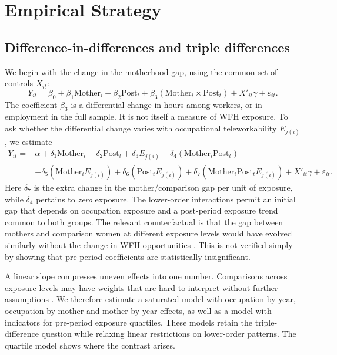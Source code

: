 \documentclass[12pt,a4paper]{article}
\newcommand{\Mother}{\text{Mother}}
\newcommand{\Post}{\text{Post}}
\begin{document}
\section{Empirical Strategy}\label{sec:strategy}
\subsection{Difference-in-differences and triple differences}
We begin with the change in the motherhood gap, using the common set of controls $X_{it}$:
\begin{equation}\label{eq:did}
Y_{it}=\beta_0+\beta_1\Mother_i+\beta_2\Post_t+\beta_3(\Mother_i\times\Post_t)+X'_{it}\gamma+\varepsilon_{it}.
\end{equation}
The coefficient $\beta_3$ is a differential change in hours among workers, or in employment in the full sample. It is not itself a measure of WFH exposure. To ask whether the differential change varies with occupational teleworkability $E_{j(i)}$, we estimate
\begin{equation}\label{eq:ddd}
\begin{split}
Y_{it}={}&\alpha+\delta_1\Mother_i+\delta_2\Post_t+\delta_3 E_{j(i)}
+\delta_4(\Mother_i\Post_t)\\
&+\delta_5(\Mother_i E_{j(i)})+\delta_6(\Post_t E_{j(i)})
+\delta_7(\Mother_i\Post_t E_{j(i)})+X'_{it}\gamma+\varepsilon_{it}.
\end{split}
\end{equation}
Here $\delta_7$ is the extra change in the mother/comparison gap per unit of exposure, while $\delta_4$ pertains to \emph{zero} exposure. The lower-order interactions permit an initial gap that depends on occupation exposure and a post-period exposure trend common to both groups. The relevant counterfactual is that the gap between mothers and comparison women at different exposure levels would have evolved similarly without the change in WFH opportunities \citep{olden2022}. This is not verified simply by showing that pre-period coefficients are statistically insignificant.

A linear slope compresses uneven effects into one number. Comparisons across exposure levels may have weights that are hard to interpret without further assumptions \citep{callaway2024}. We therefore estimate a saturated model with occupation-by-year, occupation-by-mother and mother-by-year effects, as well as a model with indicators for pre-period exposure quartiles. These models retain the triple-difference question while relaxing linear restrictions on lower-order patterns. The quartile model shows where the contrast arises.
\end{document}
